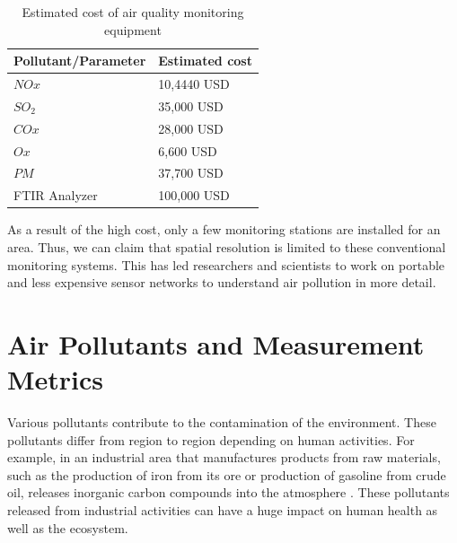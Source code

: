  \begin{table}[h]
   
   
     \begin{tabularx}{\columnwidth}{X|X}
         \hline
         Pollutant/Parameter           & Estimated cost    \\
         \hline
     
       $NOx$   & 10,4440         USD \\ 
       $SO_2$   & 35,000          USD \\ 
       $COx$   & 28,000          USD\\ 
       $Ox$   & 6,600            USD\\ 
       $PM$   & 37,700           USD\\ 
      
       FTIR Analyzer   & 100,000 USD\\ \hline
      
         
       
   \end{tabularx}
     \caption{Estimated cost of air quality monitoring equipment \cite{Mussatti2000}}
     \label{table:cost}
   \end{table}
 
 
   \hspace{1 cm}

 As a result of the high cost, only a few monitoring stations are installed for an area. Thus, we can claim that spatial resolution is limited to these conventional monitoring systems. This has led researchers and scientists to work on portable and less expensive sensor networks to understand air pollution in more detail.
 


 
\section{Air Pollutants and Measurement Metrics}


Various pollutants contribute to the contamination of the environment. These pollutants differ from region to region depending on human activities. For example, in an industrial area that manufactures products from raw materials, such as the production of iron from its ore or production of gasoline from crude oil, releases inorganic carbon compounds into the atmosphere \cite{Vallero2014}. These pollutants released from industrial activities can have a huge impact on human health as well as the ecosystem.  %


